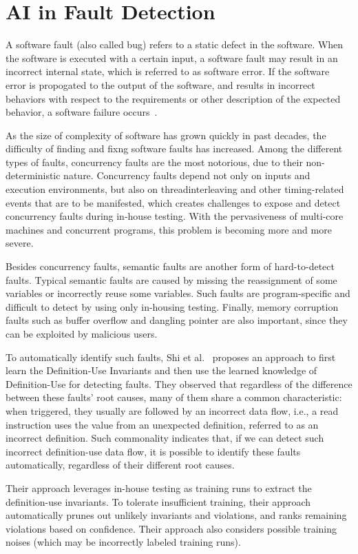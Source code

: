 \section{AI in Fault Detection}
A software fault (also called bug) refers to a static defect in the software. When the software is executed with a certain input, a software fault may result in an incorrect internal state, which is referred to as software error. If the software error is propogated to the output of the software, and results in incorrect behaviors with respect to the requirements or other description of the expected behavior, a software failure occurs~\cite{testbook}. 

As the size of complexity of software has grown quickly in past decades, the difficulty of finding and fixng software faults has increased. Among the different types of faults, concurrency faults are the most notorious, due to their non-deterministic nature. Concurrency faults depend not only on inputs and execution environments, but also on threadinterleaving and other timing-related events that are to be manifested, which creates challenges to expose and detect concurrency faults during in-house testing. With the pervasiveness of multi-core machines and concurrent programs, this problem is becoming more and more severe.

Besides concurrency faults, semantic faults are another form of hard-to-detect faults. Typical semantic faults are caused by missing the reassignment of some variables or incorrectly reuse some variables. Such faults are program-specific and difficult to detect by using only in-housing testing. Finally, memory corruption faults such as buffer overflow and dangling pointer are also important, since they can be exploited by malicious users.

To automatically identify such faults, Shi et al.~\cite{wrongDefinition} proposes an approach to first learn the Definition-Use Invariants and then use the learned knowledge of Definition-Use for detecting faults. They observed that regardless of the difference between these faults' root causes, many of them share a common characteristic: when triggered, they usually are followed by an incorrect data flow, i.e., a read instruction uses the value from an unexpected definition, referred to as an incorrect definition. Such commonality indicates that, if we can detect such incorrect definition-use data flow, it is possible to identify these faults automatically, regardless of their different root causes.

Their approach leverages in-house testing as training runs to extract the definition-use invariants. To tolerate insufficient training, their approach automatically prunes out unlikely invariants and violations, and ranks remaining violations based on confidence. Their approach also considers possible training noises (which
may be incorrectly labeled training runs).

